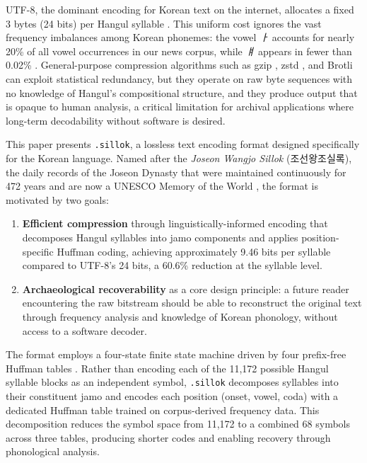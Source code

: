 \documentclass[conference]{IEEEtran}
\begin{document}
UTF-8, the dominant encoding for Korean text on the internet, allocates a fixed 3 bytes (24 bits) per Hangul syllable \cite{rfc3629, unicodehangul}. This uniform cost ignores the vast frequency imbalances among Korean phonemes: the vowel \emph{ㅏ} accounts for nearly 20\% of all vowel occurrences in our news corpus, while \emph{ㅒ} appears in fewer than 0.02\% \cite{kref}. General-purpose compression algorithms such as gzip \cite{gzip}, zstd \cite{zstd}, and Brotli \cite{brotli} can exploit statistical redundancy, but they operate on raw byte sequences with no knowledge of Hangul's compositional structure, and they produce output that is opaque to human analysis, a critical limitation for archival applications where long-term decodability without software is desired.

This paper presents \texttt{.sillok}, a lossless text encoding format designed specifically for the Korean language. Named after the \emph{Joseon Wangjo Sillok} (조선왕조실록), the daily records of the Joseon Dynasty that were maintained continuously for 472 years and are now a UNESCO Memory of the World \cite{sillok}, the format is motivated by two goals:

\begin{enumerate}
    \item \textbf{Efficient compression} through linguistically-informed encoding that decomposes Hangul syllables into jamo components and applies position-specific Huffman coding, achieving approximately 9.46 bits per syllable compared to UTF-8's 24 bits, a 60.6\% reduction at the syllable level.

    \item \textbf{Archaeological recoverability} as a core design principle: a future reader encountering the raw bitstream should be able to reconstruct the original text through frequency analysis and knowledge of Korean phonology, without access to a software decoder.
\end{enumerate}

The format employs a four-state finite state machine driven by four prefix-free Huffman tables \cite{huffman}. Rather than encoding each of the 11,172 possible Hangul syllable blocks as an independent symbol, \texttt{.sillok} decomposes syllables into their constituent jamo and encodes each position (onset, vowel, coda) with a dedicated Huffman table trained on corpus-derived frequency data. This decomposition reduces the symbol space from 11,172 to a combined 68 symbols across three tables, producing shorter codes and enabling recovery through phonological analysis.
\end{document}

